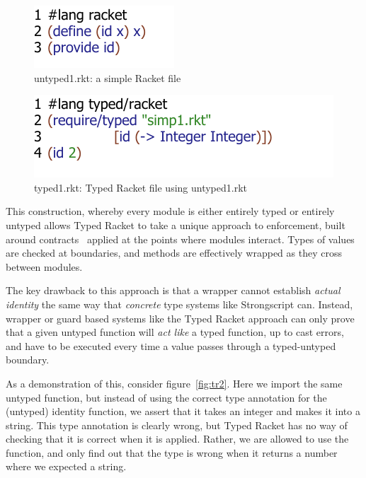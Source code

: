 \documentclass[a4paper,USenglish]{tex/lipics-v2016}
\begin{document}
\begin{figure}[h]
\includegraphics{figures/untyped-rkt1.pdf}
\caption{untyped1.rkt: a simple Racket file}
\label{fig:ut1r}
\end{figure}

\begin{figure}
\includegraphics{figures/typed-rkt1.pdf}
\caption{typed1.rkt: Typed Racket file using untyped1.rkt}
\label{fig:t1r}
\end{figure}

This construction, whereby every module is either entirely typed or entirely
untyped allows Typed Racket to take a unique approach to enforcement, built
around contracts~\cite{tf-popl08} applied at the points where modules
interact. Types of values are checked at boundaries, and methods are
effectively wrapped as they cross between modules.

The key drawback to this approach is that a wrapper cannot establish
\emph{actual identity} the same way that \emph{concrete} type systems like
Strongscript can. Instead, wrapper or guard based systems like the Typed
Racket approach can only prove that a given untyped function will \emph{act
  like} a typed function, up to cast errors, and have to be executed every
time a value passes through a typed-untyped boundary.

As a demonstration of this, consider figure~\ref{fig:tr2}. Here we import
the same untyped function, but instead of using the correct type annotation
for the (untyped) identity function, we assert that it takes an integer and
makes it into a string. This type annotation is clearly wrong, but Typed
Racket has no way of checking that it is correct when it is applied. Rather,
we are allowed to use the  function, and only find out that the type
is wrong when it returns a number where we expected a string.
\end{document}
